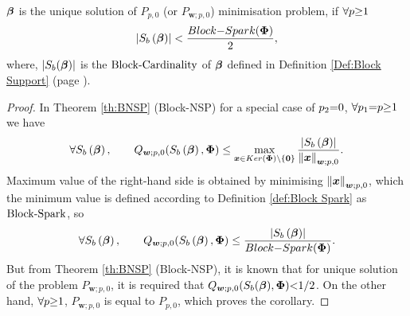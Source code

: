 \begin{corollary}
\label{crl:BERC-BNSP-BS-beta}
$\boldsymbol{\beta}$ is the unique solution of $P_{p,0}$ (or $P_{\boldsymbol{w};p,0}$) minimisation problem, if $\forall p {\geq} 1$
\begin{equation*}
\left\lvert S_b\left( \boldsymbol{\beta} \right)\right\rvert < \frac{Block{-}Spark(\boldsymbol{\Phi})}{2},
\end{equation*}
where, $\left\lvert S_b(\boldsymbol{\beta})\right\rvert$ is the $\mathrm{Block\text{{-}}Cardinality}$ of $\boldsymbol{\beta}$ defined in Definition \ref{Def:Block Support} (page \pageref{Def:Block Support}).
\end{corollary}
\begin{proof}
In Theorem \ref{th:BNSP} (Block-NSP) for a special case of $p_2 {=} 0$, $\forall p_1 {=} p {\geq} 1$ we have
\begin{equation*}
\forall S_b\left( \boldsymbol{\beta} \right), \qquad Q_{\boldsymbol{w};p,0}(S_b\left( \boldsymbol{\beta} \right),\boldsymbol{\Phi}) \leq \max_{\boldsymbol{x} \in Ker(\boldsymbol{\Phi}) \backslash\left\{\boldsymbol{0}\right\}} \frac{\left\lvert S_b\left( \boldsymbol{\beta} \right)\right\rvert}{\left\lVert\boldsymbol{x}\right\rVert_{\boldsymbol{w};p,0}}.
\end{equation*}
Maximum value of the right-hand side is obtained by minimising $\left\lVert\boldsymbol{x}\right\rVert_{\boldsymbol{w};p,0}$, which the minimum value is defined according to Definition \ref{def:Block Spark} as $\mathrm{Block\text{{-}}Spark}$, so
\begin{equation*}
\forall S_b\left( \boldsymbol{\beta} \right), \qquad Q_{\boldsymbol{w};p,0}(S_b\left( \boldsymbol{\beta} \right),\boldsymbol{\Phi}) \leq \frac{\left\lvert S_b\left( \boldsymbol{\beta} \right)\right\rvert}{Block{-}Spark(\boldsymbol{\Phi})}.
\end{equation*}
But from Theorem \ref{th:BNSP} (Block-NSP), it is known that for unique solution of the problem $P_{\boldsymbol{w};p,0}$, it is required that $Q_{\boldsymbol{w};p,0}(S_b(\boldsymbol{\beta}),\boldsymbol{\Phi}) {<} 1/2$.
On the other hand, $\forall p {\geq} 1$, $P_{\boldsymbol{w};p,0}$ is equal to $P_{p,0}$, which proves the corollary.
\end{proof}